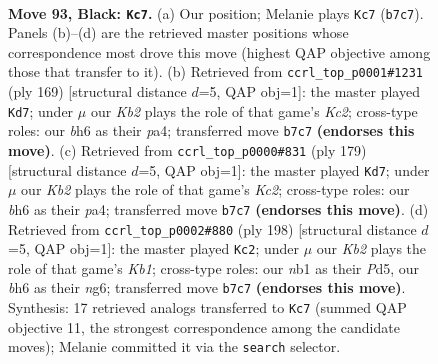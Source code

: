 \documentclass[11pt]{article}
\begin{document}
\clearpage

\begin{figure}[p]\centering
\begin{subfigure}{0.46\textwidth}\centering
\resizebox{\linewidth}{!}{%
\newchessgame
\chessboard[
  setfen={8/1k6/7B/8/p1p3b1/8/5K2/1N6 b - - 41 93},
  showmover=false,
  pgfstyle=straightmove, color=movearrow, markmove={b7-c7}
]}
\caption{}
\end{subfigure}\hfill
\begin{subfigure}{0.46\textwidth}\centering
\resizebox{\linewidth}{!}{%
\newchessgame
\chessboard[
  setfen={8/2k5/8/p7/P7/3N4/K3p3/8 b - - 15 85},
  showmover=false,
  pgfstyle=straightmove, color=movearrow, markmove={c7-d7}
]}
\caption{}
\end{subfigure}
\\[4pt]
\begin{subfigure}{0.46\textwidth}\centering
\resizebox{\linewidth}{!}{%
\newchessgame
\chessboard[
  setfen={8/2k5/8/p2K4/P7/3N4/4p3/8 b - - 47 90},
  showmover=false,
  pgfstyle=straightmove, color=movearrow, markmove={c7-d7}
]}
\caption{}
\end{subfigure}\hfill
\begin{subfigure}{0.46\textwidth}\centering
\resizebox{\linewidth}{!}{%
\newchessgame
\chessboard[
  setfen={8/3B4/3p2n1/3P4/1k6/8/8/1K6 w - - 13 100},
  showmover=false,
  pgfstyle=straightmove, color=movearrow, markmove={b1-c2}
]}
\caption{}
\end{subfigure}
\caption{\textbf{Move 93, Black: \texttt{Kc7}.} (a) Our position; Melanie plays \texttt{Kc7} (\texttt{b7c7}). Panels (b)--(d) are the retrieved master positions whose correspondence most drove this move (highest QAP objective among those that transfer to it). (b) Retrieved from \texttt{ccrl\_top\_p0001\#1231} (ply 169) [structural distance $d$=5, QAP obj=1]: the master played \texttt{Kd7}; under $\mu$ our \emph{Kb2} plays the role of that game's \emph{Kc2}; cross-type roles: our \emph{b}h6 as their \emph{p}a4; transferred move \texttt{b7c7} \textbf{(endorses this move)}. (c) Retrieved from \texttt{ccrl\_top\_p0000\#831} (ply 179) [structural distance $d$=5, QAP obj=1]: the master played \texttt{Kd7}; under $\mu$ our \emph{Kb2} plays the role of that game's \emph{Kc2}; cross-type roles: our \emph{b}h6 as their \emph{p}a4; transferred move \texttt{b7c7} \textbf{(endorses this move)}. (d) Retrieved from \texttt{ccrl\_top\_p0002\#880} (ply 198) [structural distance $d$=5, QAP obj=1]: the master played \texttt{Kc2}; under $\mu$ our \emph{Kb2} plays the role of that game's \emph{Kb1}; cross-type roles: our \emph{n}b1 as their \emph{P}d5, our \emph{b}h6 as their \emph{n}g6; transferred move \texttt{b7c7} \textbf{(endorses this move)}. Synthesis: 17 retrieved analogs transferred to \texttt{Kc7} (summed QAP objective 11, the strongest correspondence among the candidate moves); Melanie committed it via the \texttt{search} selector.}
\label{fig:thought-m185}
\end{figure}
\end{document}
